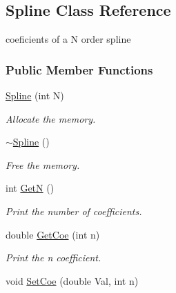 \hypertarget{classSpline}{\subsection{\-Spline \-Class \-Reference}
\label{classSpline}
}


coeficients of a \-N order spline  


\subsubsection*{\-Public \-Member \-Functions}
\begin{DoxyCompactItemize}
\item 
\hypertarget{classSpline_afe6c93178a46d4e14c44c1d880c20c1b}{\hyperlink{classSpline_afe6c93178a46d4e14c44c1d880c20c1b}{\-Spline} (int \-N)}\label{classSpline_afe6c93178a46d4e14c44c1d880c20c1b}

\begin{DoxyCompactList}\small\item\em \-Allocate the memory. \end{DoxyCompactList}\item 
\hypertarget{classSpline_afe1affe99df46c8cce9f9853471f6e1b}{\hyperlink{classSpline_afe1affe99df46c8cce9f9853471f6e1b}{$\sim$\-Spline} ()}\label{classSpline_afe1affe99df46c8cce9f9853471f6e1b}

\begin{DoxyCompactList}\small\item\em \-Free the memory. \end{DoxyCompactList}\item 
\hypertarget{classSpline_a265beffc4c9c8e21a31ae1af9f681f2a}{int \hyperlink{classSpline_a265beffc4c9c8e21a31ae1af9f681f2a}{\-Get\-N} ()}\label{classSpline_a265beffc4c9c8e21a31ae1af9f681f2a}

\begin{DoxyCompactList}\small\item\em \-Print the number of coefficients. \end{DoxyCompactList}\item 
\hypertarget{classSpline_aa2adff2f3dc7758073e3bcf79b67d678}{double \hyperlink{classSpline_aa2adff2f3dc7758073e3bcf79b67d678}{\-Get\-Coe} (int n)}\label{classSpline_aa2adff2f3dc7758073e3bcf79b67d678}

\begin{DoxyCompactList}\small\item\em \-Print the n coefficient. \end{DoxyCompactList}\item 
\hypertarget{classSpline_ae74ad20f1ff215326c2ef49911e605b1}{void \hyperlink{classSpline_ae74ad20f1ff215326c2ef49911e605b1}{\-Set\-Coe} (double \-Val, int n)}\label{classSpline_ae74ad20f1ff215326c2ef49911e605b1}


\end{DoxyCompactItemize}
